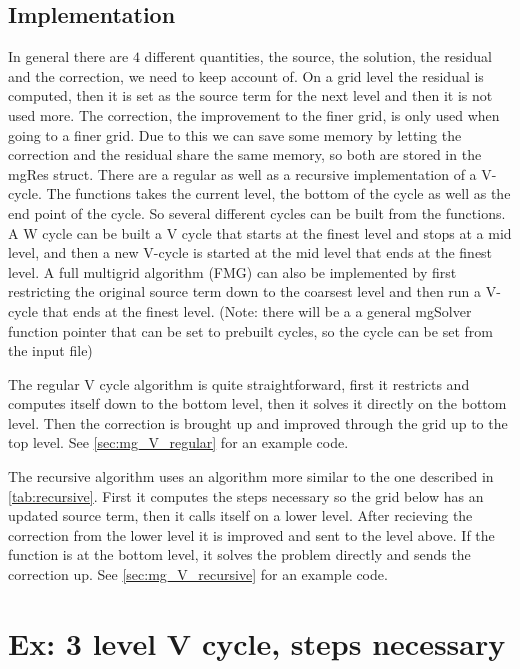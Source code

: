 		\subsection{Implementation}
			In general there are \(4\) different quantities, the source, the solution, the residual and the correction, we need to keep account of.
			On a grid level the residual is computed, then it is set as the source term for the next level and then it is not used more.
			The correction, the improvement to the finer grid, is only used when going to a finer grid. Due to this we can save some memory by
			letting the correction and the residual share the same memory, so both are stored in the mgRes struct. There are a regular as well as a recursive implementation
			of a V-cycle. The functions takes the current level, the bottom of the cycle as well as the end point of the cycle. So several different cycles
			can be built from the functions. A W cycle can be built a V cycle that starts at the finest level and stops at a mid level, and then a new V-cycle is started at
			the mid level that ends at the finest level. A full multigrid algorithm (FMG) can also be implemented by first restricting the original source term down to the coarsest
			level and then run a V-cycle that ends at the finest level.
			(Note: there will be a a general mgSolver function pointer that can be set to prebuilt cycles, so the cycle can be set from the input file)

			The regular V cycle algorithm is quite straightforward, first it restricts and computes itself down to the bottom level,
			then it solves it directly on the bottom level. Then the correction is brought up and improved through the grid up to the top level.
			See \cref{sec:mg_V_regular} for an example code.

			The recursive algorithm uses an algorithm more similar to the one described in \cref{tab:recursive}. First it computes the steps necessary
			so the grid below has an updated source term, then it calls itself on a lower level. After recieving the correction from
			the lower level it is improved and sent to the level above. If the function is at the bottom level, it solves the problem directly and sends
			the correction up. See \cref{sec:mg_V_recursive} for an example code.







\section{Ex: 3 level V cycle, steps necessary}
	\label{sec:EX_V_Ccyles}

